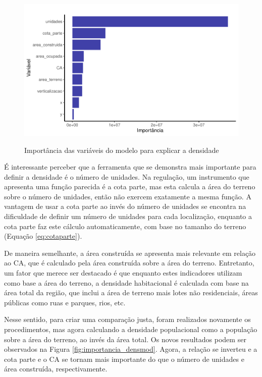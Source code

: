 \begin{figure}[h]
    \centering
    \caption{Importância das variáveis do modelo para explicar a densidade}
    \includegraphics[width = .8\linewidth]{imagens/var_importance.pdf}
    \label{fig:importancia}
\end{figure}

É interessante perceber que a ferramenta que se demonstra mais importante para definir a densidade é o número de unidades. Na regulação, um instrumento que apresenta uma função parecida é a cota parte, mas esta calcula a área do terreno sobre o número de unidades, então não exercem exatamente a mesma função. A vantagem de usar a cota parte ao invés do número de unidades se encontra na dificuldade de definir um número de unidades para cada localização, enquanto a cota parte faz este cálculo automaticamente, com base no tamanho do terreno (Equação \ref{eq:cotaparte}).

De maneira semelhante, a área construída se apresenta mais relevante em relação ao CA, que é calculado pela área construída sobre a área do terreno. Entretanto, um fator que merece ser destacado é que enquanto estes indicadores utilizam como base a área do terreno, a densidade habitacional é calculada com base na área total da região, que inclui a área de terreno mais lotes não residenciais, áreas públicas como ruas e parques, rios, etc.

Nesse sentido, para criar uma comparação justa, foram realizados novamente os procedimentos, mas agora calculando a densidade populacional como a população sobre a área do terreno, ao invés da área total. Os novos resultados podem ser observados na Figura \ref{fig:importancia_densmod}. Agora, a relação se inverteu e a cota parte e o CA se tornam mais importante do que o número de unidades e área construída, respectivamente.

